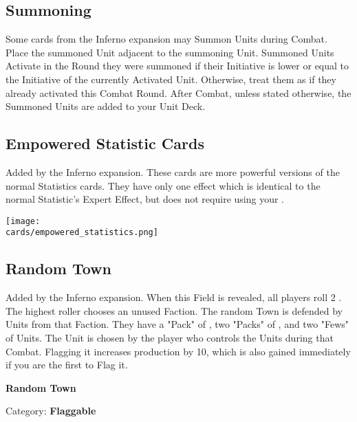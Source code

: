 \begin{multicols*}{2}
\subsection*{Summoning}
Some cards from the Inferno expansion may Summon Units during Combat.
Place the summoned Unit adjacent to the summoning Unit.
Summoned Units Activate in the Round they were summoned if their Initiative is lower or equal to the Initiative of the currently Activated Unit.
Otherwise, treat them as if they already activated this Combat Round.
After Combat, unless stated otherwise, the Summoned Units are added to your Unit Deck.

\subsection*{Empowered Statistic Cards}
Added by the Inferno expansion.
These cards are more powerful versions of the normal Statistics cards.
They have only one effect which is identical to the normal Statistic's Expert Effect, but does not require using your .

\begin{center}
  \texttt{[image: \\cards/empowered\_statistics.png]}
\end{center}

\subsection*{Random Town}
Added by the Inferno expansion.
When this Field is revealed, all players roll 2 .
The highest roller chooses an unused Faction.
The random Town is defended by Units from that Faction.
They have a "Pack" of , two "Packs" of , and two "Fews" of  Units.
The  Unit is chosen by the player who controls the Units during that Combat.
Flagging it increases  production by 10, which is also gained immediately if you are the first to Flag it.

\bigskip

\begin{minipage}[h]{\linewidth}
  \begin{center}
    \textbf{Random Town}\medskip
  \end{center}
  \small{Category: \textbf{Flaggable}}
\end{minipage}

\end{multicols*}
